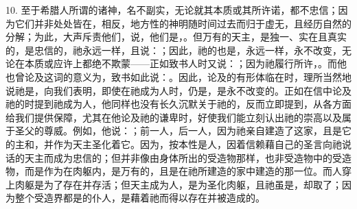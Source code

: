 10. 至于希腊人所谓的诸神，名不副实，无论就其本质或其所许诺，都不忠信；因为它们并非处处皆在，相反，地方性的神明随时间过去而归于虚无，且经历自然的分解；为此，大声斥责他们，说，他们是，。但万有的天主，是独一、实在且真实的，是忠信的，祂永远一样，且说：；因此，祂的也是，永远一样，永不改变，无论在本质或应许上都绝不欺蒙——正如致书人时又说：；因为祂履行所许，。而他也曾论及这词的意义为，致书如此说：。因此，论及的有形体临在时，理所当然地说祂是，向我们表明，即使在祂成为人时，仍是，是永不改变的。正如在信中论及祂的时提到祂成为人，他同样也没有长久沉默关于祂的，反而立即提到，从各方面给我们提供保障，尤其在他论及祂的谦卑时，好使我们能立刻认出祂的崇高以及属于圣父的尊威。例如，他说：；前一人，后一人，因为祂亲自建造了这家，且是它的主和，并作为天主圣化着它。因为，按本性是人，因着信赖藉自己的圣言向祂说话的天主而成为忠信的；但并非像由身体所出的受造物那样，也非受造物中的受造物，而是作为在肉躯内，是万有的，且是在祂所建造的家中建造的那一位。而人穿上肉躯是为了存在并存活；但天主成为人，是为圣化肉躯，且祂虽是，却取了；因为整个受造界都是的仆人，是藉着祂而得以存在并被造成的。\par

